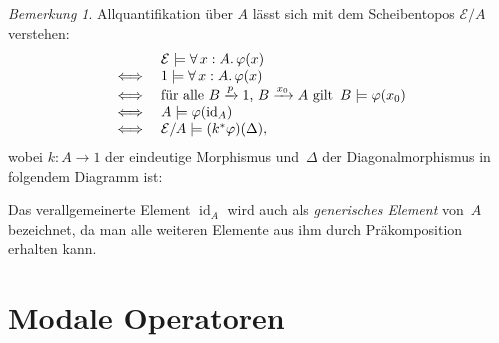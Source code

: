 \documentclass{article}
\theoremstyle{definition}
\theoremstyle{remark}
\newtheorem*{bem}{Bemerkung}
\newcommand{\?}{\,{:}\,}
\renewcommand{\_}{\mathpunct{.}\,}
\newcommand{\fa}[1]{\forall \, {#1} .\,}
\DeclareMathOperator{\id}{id} %
\newcommand{\Eat}{\mathcal{E}} %
\begin{document}
\begin{bem}
  Allquantifikation über $A$ lässt sich mit dem Scheibentopos $\Eat/A$ verstehen:
  \[
    \begin{array}{r l}
      & \Eat \models \fa{x:A} \varphi(x) \\
      \iff & 1 \models \fa{x:A} \varphi(x) \\
      \iff & \text{für alle $B \xrightarrow{p} 1$, $B \xrightarrow{x_0} A$ gilt} \enspace B \models \varphi(x_0) \\
      \iff & A \models \varphi(\id_A) \\
      \iff & \Eat/A \models (k^* \varphi)(\Delta), \\
    \end{array}
  \]
  wobei $k : A \to 1$ der eindeutige Morphismus und~$\Delta$ der Diagonalmorphismus in folgendem Diagramm ist:
  \begin{center}\end{center}
  Das verallgemeinerte Element $\id_A$ wird auch als \emph{generisches Element} von~$A$ bezeichnet, da man alle weiteren Elemente aus ihm durch Präkomposition erhalten kann.
\end{bem}

\section{Modale Operatoren}
\end{document}
